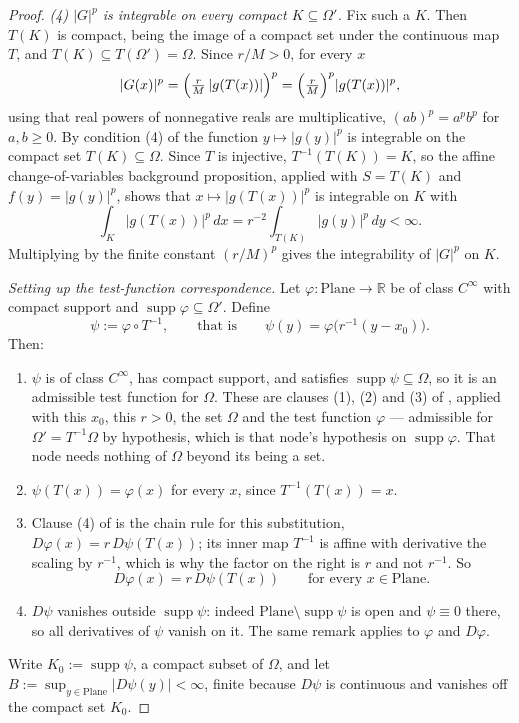\begin{proof}
\medskip\noindent\emph{(4) $\lvert G\rvert^{p}$ is integrable on every compact
$K\subseteq\Omega'$.}
Fix such a $K$.  Then $T(K)$ is compact, being the image of a compact set under the continuous
map $T$, and $T(K)\subseteq T(\Omega')=\Omega$.  Since $r/M>0$, for every $x$
\[
  \lvert G(x)\rvert^{p}
  =\Bigl(\tfrac rM\,\lvert g(T(x))\rvert\Bigr)^{p}
  =\Bigl(\tfrac rM\Bigr)^{p}\lvert g(T(x))\rvert^{p},
\]
using that real powers of nonnegative reals are multiplicative,
$(ab)^{p}=a^{p}b^{p}$ for $a,b\ge0$.  By condition (4) of  the function
$y\mapsto\lvert g(y)\rvert^{p}$ is integrable on the compact set $T(K)\subseteq\Omega$.  Since
$T$ is injective, $T^{-1}(T(K))=K$, so the affine change-of-variables background proposition,
applied with $S=T(K)$ and $f(y)=\lvert g(y)\rvert^{p}$, shows that
$x\mapsto\lvert g(T(x))\rvert^{p}$ is integrable on $K$ with
\[
  \int_{K}\lvert g(T(x))\rvert^{p}\,dx=r^{-2}\int_{T(K)}\lvert g(y)\rvert^{p}\,dy<\infty .
\]
Multiplying by the finite constant $(r/M)^{p}$ gives the integrability of
$\lvert G\rvert^{p}$ on $K$.

\medskip\noindent\emph{Setting up the test-function correspondence.}
Let $\varphi\colon\mathrm{Plane}\to\mathbb{R}$ be of class $C^\infty$ with compact support and
$\operatorname{supp}\varphi\subseteq\Omega'$.  Define
\[
  \psi:=\varphi\circ T^{-1},\qquad\text{that is}\qquad \psi(y)=\varphi\bigl(r^{-1}(y-x_0)\bigr).
\]
Then:
\begin{enumerate}
\item[(i)--(ii)] $\psi$ is of class $C^\infty$, has compact support, and satisfies
$\operatorname{supp}\psi\subseteq\Omega$, so it is an admissible test function for $\Omega$.
These are clauses (1), (2) and (3) of , applied with this
$x_0$, this $r>0$, the set $\Omega$ and the test function $\varphi$ --- admissible for
$\Omega'=T^{-1}\Omega$ by hypothesis, which is that node's hypothesis on
$\operatorname{supp}\varphi$.  That node needs nothing of $\Omega$ beyond its being a set.
\item[(iii)] $\psi(T(x))=\varphi(x)$ for every $x$, since $T^{-1}(T(x))=x$.
\item[(iv)] Clause (4) of  is the chain rule for this
substitution, $D\varphi(x)=r\,D\psi(T(x))$; its inner map $T^{-1}$ is affine with derivative
the scaling by $r^{-1}$, which is why the factor on the right is $r$ and not $r^{-1}$.  So
\begin{equation}\label{eq:phn-chain}
  D\varphi(x)=r\,D\psi(T(x))\qquad\text{for every }x\in\mathrm{Plane}.
\end{equation}
\item[(v)] $D\psi$ vanishes outside $\operatorname{supp}\psi$: indeed
$\mathrm{Plane}\setminus\operatorname{supp}\psi$ is open and $\psi\equiv0$ there, so all
derivatives of $\psi$ vanish on it.  The same remark applies to $\varphi$ and $D\varphi$.
\end{enumerate}
Write $K_0:=\operatorname{supp}\psi$, a compact subset of $\Omega$, and let
$B:=\sup_{y\in\mathrm{Plane}}\lvert D\psi(y)\rvert<\infty$, finite because $D\psi$ is
continuous and vanishes off the compact set $K_0$.


\end{proof}

